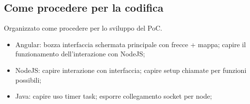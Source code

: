 \subsection{Come procedere per la codifica}
Organizzato come procedere per lo sviluppo del PoC.
\begin{itemize}
\item Angular: bozza interfaccia
	\subitem schermata principale con frecce + mappa;
	\subitem capire il funzionamento dell'interazione con NodeJS;
\item NodeJS: 
	\subitem capire interazione con interfaccia;
	\subitem capire setup chiamate per funzioni possibili;
\item Java: 
	\subitem capire uso timer task;
	\subitem esporre collegamento socket per node;
\end{itemize}
	